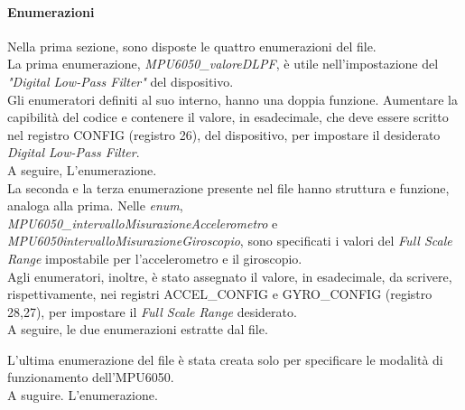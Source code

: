 \documentclass[11pt]{report}
\begin{document}
\paragraph{Enumerazioni}
Nella prima sezione, sono disposte le quattro enumerazioni del file.\\
La prima enumerazione, \textit{MPU6050\_valoreDLPF}, è utile nell'impostazione del \textit{"Digital Low-Pass Filter"} del dispositivo.\\
Gli enumeratori definiti al suo interno, hanno una doppia funzione. Aumentare la capibilità del codice e contenere
il valore, in esadecimale, che deve essere scritto nel registro CONFIG (registro 26), del dispositivo, per impostare il desiderato \textit{Digital Low-Pass Filter}.\\
A seguire, L'enumerazione.\\

La seconda e la terza enumerazione presente nel file hanno struttura e funzione, analoga alla prima.
Nelle \textit{enum},\\ \textit{MPU6050\_intervalloMisurazioneAccelerometro} e \textit{MPU6050intervalloMisurazioneGiroscopio}, sono specificati i valori del \textit{Full Scale Range} impostabile per l'accelerometro e il giroscopio.\\
Agli enumeratori, inoltre, è stato assegnato il valore, in esadecimale, da scrivere, rispettivamente, nei registri ACCEL\_CONFIG e GYRO\_CONFIG (registro 28,27), per impostare il \textit{Full Scale Range} desiderato.\\
A seguire, le due enumerazioni estratte dal file.
\newpage

L'ultima enumerazione del file è stata creata solo per specificare le modalità di funzionamento dell'MPU6050.\\
A suguire. L'enumerazione.\\

\end{document}
